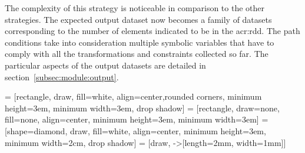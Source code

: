 The complexity of this strategy is noticeable in comparison to the other strategies. The expected output dataset now becomes a family of datasets corresponding to the number of elements indicated to be in the \acrshort{acr:rdd}. The path conditions take into consideration multiple symbolic variables that have to comply with all the transformations and constraints collected so far. The particular aspects of the output datasets are detailed in section~\ref{subsec:module:output}.

 = [rectangle, draw, fill=white, align=center,rounded corners, minimum height=3em, minimum width=3em, drop shadow]
 = [rectangle, draw=none, fill=none, align=center, minimum height=3em, minimum width=3em]
 = [shape=diamond, draw, fill=white, align=center, minimum height=3em, minimum width=2cm, drop shadow]
 = [draw, -{>[length=2mm, width=1mm]}]


